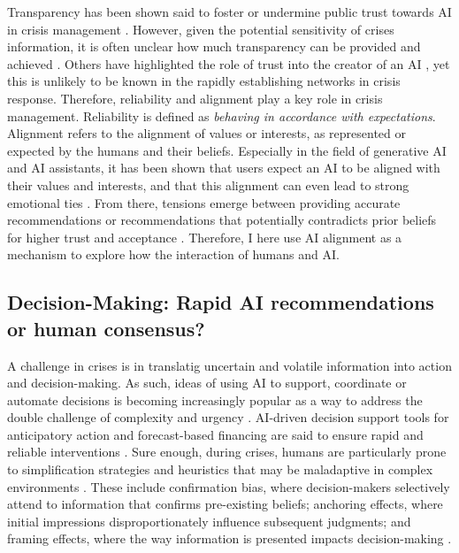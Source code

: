\documentclass[pdflatex,sn-apa]{sn-jnl}%
\begin{document}
Transparency has been shown said to foster or undermine public trust towards AI in crisis management \citep{steinbrink2024impact, visave2025transparency}. However, given the potential sensitivity of crises information, it is often unclear how much transparency can be provided and achieved \citep{steinbrink2024impact}. Others have highlighted the role of trust into the creator of an AI \citep{saffarizadeh2024relationship}, yet this is unlikely to be known in the rapidly establishing networks in crisis response. Therefore, reliability and alignment play a key role in crisis management. Reliability is defined as \textit{behaving in accordance with expectations}. Alignment refers to the alignment of values or interests, as represented or expected by the humans and their beliefs. Especially in the field of generative AI and AI assistants, it has been shown that users expect an AI to be aligned with their values and interests, and that this alignment can even lead to strong emotional ties \citep{manzini2024should, kaplan2023trust}. From there, tensions emerge between providing accurate recommendations or recommendations that potentially contradicts prior beliefs for higher trust and acceptance \citep{sharma2024generative, ekstrom2022self}. Therefore, I here use AI alignment as a mechanism to explore how the interaction of humans and AI. 

\subsection{Decision-Making: Rapid AI recommendations or human consensus?}
A challenge in crises is in translatig uncertain and volatile information into action and decision-making. As such, ideas of using AI to support, coordinate or automate decisions is becoming increasingly popular as a way to address the double challenge of complexity and urgency \citep{comes2024ai}. AI-driven decision support tools for anticipatory action and forecast-based financing are said to ensure rapid and reliable interventions \citep{thalheimer2022role}. Sure enough, during crises, humans are particularly prone to simplification strategies and heuristics that may be maladaptive in complex environments \citep{klein2010rapid}. These include confirmation bias, where decision-makers selectively attend to information that confirms pre-existing beliefs; anchoring effects, where initial impressions disproportionately influence subsequent judgments; and framing effects, where the way information is presented impacts decision-making \citep{paulus2022influence}. %
\end{document}
